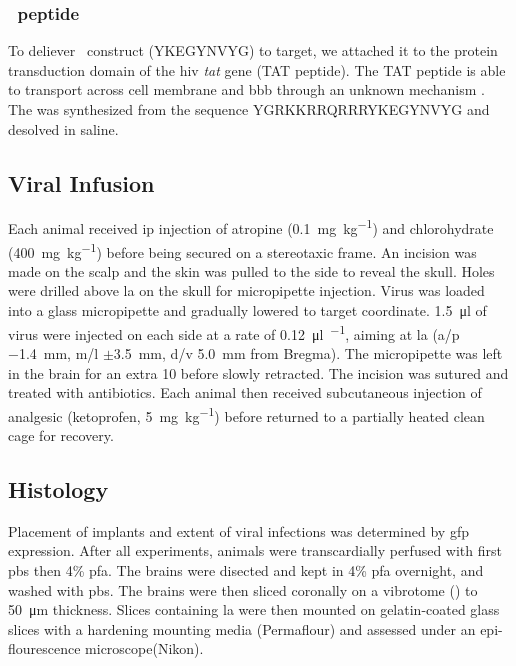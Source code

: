 \subsubsection{\tglu~peptide}
To deliever \glu~construct (YKEGYNVYG) to target, we attached it to the protein transduction domain of the \gls{hiv} \textit{tat} gene (TAT peptide). The TAT peptide is able to transport across cell membrane and \gls{bbb} through an unknown mechanism . The \tglu was synthesized from the sequence YGRKKRRQRRRYKEGYNVYG and desolved in saline. 


\subsection{Viral Infusion}

Each animal received \gls{ip} injection of atropine (\SI{0.1}{\mg\per\kg}) and chlorohydrate (\SI{400}{\mg\per\kg}) before being secured on a stereotaxic frame. An incision was made on the scalp and the skin was pulled to the side to reveal the skull. Holes were drilled above \gls{la} on the skull for micropipette injection. Virus was loaded into a glass micropipette and gradually lowered to target coordinate. \SI{1.5}{\ul} of virus were injected on each side at a rate of \SI{0.12}{\ul\per\min}, aiming at \gls{la} (\gls{a/p} \SI{-1.4}{\mm}, \gls{m/l} $\pm$\SI{3.5}{\mm}, \gls{d/v} \SI{5.0}{\mm} from Bregma). The micropipette was left in the brain for an extra \SI{10}{\min} before slowly retracted. The incision was sutured and treated with antibiotics. Each animal then received subcutaneous injection of analgesic (ketoprofen, \SI{5}{\mg\per\kg}) before returned to a partially heated clean cage for recovery.

\subsection{Histology}
Placement of implants and extent of viral infections was determined by \gls{gfp} expression. After all experiments, animals were transcardially perfused with first \gls{pbs} then 4\% \gls{pfa}. The brains were disected and kept in 4\% \gls{pfa} overnight, and washed with \gls{pbs}. The brains were then sliced coronally on a vibrotome () to \SI{50}{\um} thickness. Slices containing \gls{la} were then mounted on gelatin-coated glass slices with a hardening mounting media (Permaflour) and assessed under an epi-flourescence microscope(Nikon).

